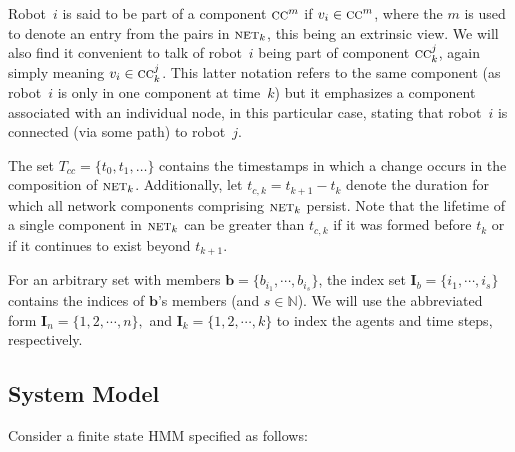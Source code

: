 \documentclass[journal]{IEEEtran}
\newcommand{\net}{\ensuremath{\textsc{net}}}
\theoremstyle{remark}
\newcommand{\bIn}{\boldsymbol{I}_{{n}}}
\newcommand{\bIk}{\boldsymbol{I}_{{k}}}
\theoremstyle{definition}
\begin{document}
Robot~$i$ is said to be part of a component $\textsc{cc}^m$  if $v_i\in \textsc{cc}^m$, where the $m$ is used to denote 
an entry from the pairs in $\net_k$, this being an extrinsic view.
We will also find it  convenient to talk of robot~$i$ being
part of component $\textsc{cc}_k^j$, again simply meaning $v_i\in \textsc{cc}_k^j$. 
This latter notation refers to the same component (as robot~$i$ is only in one component at time~$k$) but it emphasizes a component associated with an individual node, in this particular case, stating that robot~$i$ is connected (via some path) to robot~$j$.

The set $T_{cc}=\{t_0, t_1, \dots \}$ contains the timestamps in which a change occurs in the composition of $\net_k$. Additionally, let $t_{c,k} = t_{k+1} - t_{k}$ denote the duration for which all network components comprising $\net_k$ persist. Note that the lifetime of a single component in $\net_k$ can be greater than $t_{c,k}$ if it was formed before $t_{k}$ or if it continues to exist beyond $t_{k+1}$.


For an arbitrary set 
with 
members $\mathbf{b}=\{b_{i_1},\cdots,b_{i_s}\}$, 
the index set $\boldsymbol{I}_{b}=\{i_1,\cdots,i_{s}\}$ contains the indices of
$\mathbf{b}$'s members (and $s\in \mathbb{N} $). We will use the abbreviated
form  $ \bIn = 
\{1,2,\cdots,n\},$ and $\bIk = \{1,2,\cdots,k\}$ to index the agents and time 
steps, respectively.

\subsection{System Model} 

Consider a finite state HMM specified as follows:
\end{document}
